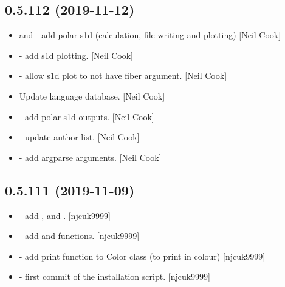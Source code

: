 \documentclass[a4paper,10pt,english]{report}
\begin{document}
\subsection{0.5.112 (2019-11-12)}
\label{\detokenize{misc/changelog:id30}}\begin{itemize}
\item {} 
 and  - add
polar s1d (calculation, file writing and plotting) {[}Neil Cook{]}

\item {} 
 - add s1d plotting. {[}Neil Cook{]}

\item {} 
 - allow s1d plot to not have fiber
argument. {[}Neil Cook{]}

\item {} 
Update language database. {[}Neil Cook{]}

\item {} 
  -
add polar s1d outputs. {[}Neil Cook{]}

\item {} 
 - update author list. {[}Neil
Cook{]}

\item {} 
 - add argparse arguments. {[}Neil Cook{]}

\end{itemize}


\subsection{0.5.111 (2019-11-09)}
\label{\detokenize{misc/changelog:id31}}\begin{itemize}
\item {} 
 - add ,
 and . {[}njcuk9999{]}

\item {} 
 - add  and
 functions. {[}njcuk9999{]}

\item {} 
 - add print function to Color
class (to print in colour) {[}njcuk9999{]}

\item {} 
 - first commit of the
installation script. {[}njcuk9999{]}

\end{itemize}
\end{document}

